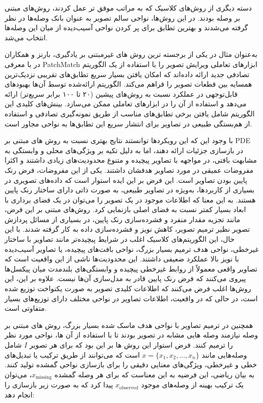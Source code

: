دسته دیگری از روش‌های کلاسیک که به مراتب موفق تر عمل کردند، روش‌های مبتنی بر وصله  بودند. در این روش‌ها، نواحی سالم تصویر به عنوان بانک وصله‌ها در نظر گرفته می‌شدند و بهترین تطابق برای پر کردن نواحی آسیب‌دیده از میان این وصله‌ها انتخاب می‌شد.

به‌عنوان مثال در یکی از برجسته ترین روش های غیرمبتنی بر یادگیری، بارنز و همکاران در \cite{barnesPatchMatchRandomizedCorrespondence2009} با معرفی PatchMatch ابزارهای تعاملی ویرایش تصویر را با استفاده از یک الگوریتم تصادفی جدید ارائه داده‌اند که امکان یافتن بسیار سریع تطابق‌های تقریبی نزدیک‌ترین همسایه بین قطعات تصویر را فراهم می‌کند. الگوریتم ارائه‌شده توسط آن‌ها بهبودهای قابل‌توجهی در عملکرد نسبت به روش‌های پیشین (۲۰ تا ۱۰۰ برابر سریع‌تر) ارائه می‌دهد و استفاده از آن را در ابزارهای تعاملی ممکن می‌سازد. بینش‌های کلیدی این الگوریتم شامل یافتن برخی تطابق‌های مناسب از طریق نمونه‌گیری تصادفی و استفاده از هم‌بستگی طبیعی در تصاویر برای انتشار سریع این تطابق‌ها به نواحی مجاور است.

با وجود این که این رویکردها توانستند نتایج بهتری نسبت به روش های مبتنی بر PDE در بازسازی جزئیات ارائه دهند، اما به دلیل تکیه بر ویژگی‌های محلی و وابستگی به مشابهت بافتی، در مواجهه با تصاویر پیچیده و متنوع محدودیت‌های زیادی داشتند و اکثرا مفروضات عمیقی در مورد تصاویر هدفشان داشتند. یکی از این مفروضات، فرض رنک پایین بودن تصاویر است. این فرض بر این ایده استوار است که داده‌های تصویری در بسیاری از کاربردها، به‌ویژه در تصاویر طبیعی، به صورت ذاتی دارای ساختار رنک پایین هستند. به این معنا که اطلاعات موجود در یک تصویر را می‌توان در یک فضای برداری با ابعاد بسیار کمتر نسبت به فضای اصلی بازنمایی کرد. روش‌های مبتنی بر این فرض، مانند تجزیه مقدار منفرد 
\cite{yaghmaeeImprovingImageInpainting2020}
 و فشرده‌سازی رنک پایین، در بسیاری از مسائل پردازش تصویر نظیر ترمیم تصویر، کاهش نویز و فشرده‌سازی داده به کار گرفته شدند. با این حال، این الگوریتم‌های کلاسیک اغلب در شرایط پیچیده‌تر مانند تصاویر با ساختار غیرخطی، نواحی هدف ترمیم بسیار بزرگ، نواحی بافت‌های پیچیده، یا تصاویر آسیب‌دیده با نویز بالا عملکرد ضعیفی داشتند. این محدودیت‌ها ناشی از این واقعیت است که تصاویر واقعی معمولاً از روابط غیرخطی پیچیده و وابستگی‌های بلندمدت میان پیکسل‌ها پیروی می‌کنند که فرض رنک پایین قادر به مدل‌سازی آن‌ها نیست. علاوه بر این، این روش‌ها اغلب فرض می‌کنند که اطلاعات کلیدی تصویر به صورت یکنواخت توزیع شده است، در حالی که در واقعیت، اطلاعات تصاویر در نواحی مختلف دارای توزیع‌های بسیار متفاوتی است.
 
 همچنین در ترمیم تصاویر با نواحی هدف ماسک شده بسیار بزرگ، روش های مبتنی بر وصله نیازمند وصله هایی مشابه در تصویر بودند تا با استفاده از آن ها، نواحی مورد نظر را ترمیم کنند. فرض استوار این روش ها بر این بود که برای هر تصویر $I$ شامل وصله‌هایی مانند $x = \{x_1, x_2, \dots, x_n\}$ است که می‌توانند از طریق ترکیب یا تبدیل‌های خطی و غیرخطی، ویژگی‌های معنایی دقیقی را برای بازسازی نواحی گمشده تولید کنند. به بیان ریاضی، این فرضیه به این معناست که برای هر وصله گمشده $x_{\text{missing}}$، می‌توان یک ترکیب بهینه از وصله‌های موجود $x_{\text{observed}}$ پیدا کرد که به صورت زیر بازسازی را انجام دهد:
 

